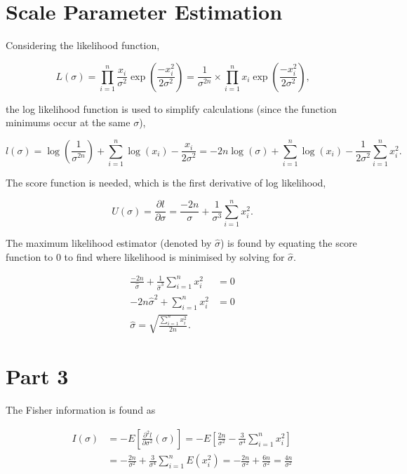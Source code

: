 \documentclass[11pt]{article}
\begin{document}
\section{Scale Parameter Estimation}

Considering the likelihood function,

$$
    L(\sigma) = \prod_{i=1}^n{ \frac{x_i}{\sigma^2} \exp\left( \frac{-x_i^2}{2 \sigma^2} \right)}
    = \frac{1}{\sigma^{2n}} \times \prod_{i=1}^n{ x_i \exp\left( \frac{-x_i^2}{2 \sigma^2} \right)} \text{,}
$$

the log likelihood function is used to simplify calculations (since the function minimums occur at the same $\sigma$),

$$
    l(\sigma) = \log\left(\frac{1}{\sigma^{2n}}\right) + \sum_{i=1}^n{ \log(x_i) - \frac{x_i}{2 \sigma^2} }
    = -2n \log(\sigma) + \sum_{i=1}^n{\log(x_i)} - \frac{1}{2 \sigma^2} \sum_{i=1}^n{x_i^2} \text{.}
$$

The score function is needed, which is the first derivative of log likelihood,

$$
    U(\sigma) = \frac{\partial l}{\partial \sigma} = \frac{-2n}{\sigma} + \frac{1}{\sigma^3} \sum_{i=1}^n{x_i^2} \text{.}
$$

The maximum likelihood estimator (denoted by $ \hat\sigma $) is found by equating the score function to 0 to find where likelihood is minimised
by solving for $ \hat\sigma $.

\begin{align*}
    \frac{-2n}{\hat{\sigma}} + \frac{1}{\hat{\sigma}^3} \sum_{i=1}^n{x_i^2} &= 0 \\
    -2n \hat\sigma^2 + \sum_{i=1}^n{x_i^2} &= 0 \\
    \hat\sigma = \sqrt{\frac{\sum_{i=1}^n{x_i^2}}{2n}} \text{.}
\end{align*}

\section*{Part 3}

The Fisher information is found as

\begin{align*}
I(\sigma) &= - E\left[ \frac{\partial^2 l}{\partial \sigma^2}(\sigma)\right]
= - E\left[ \frac{2n}{\sigma^2} - \frac{3}{\sigma^4} \sum_{i=1}^n {x_i^2} \right] \\
&= - \frac{2n}{\sigma^2} + \frac{3}{\sigma^4} \sum_{i=1}^n {E(x_i^2)}
= - \frac{2n}{\sigma^2} + \frac{6n}{\sigma^2} = \frac{4n}{\sigma^2}
\end{align*}
\end{document}
